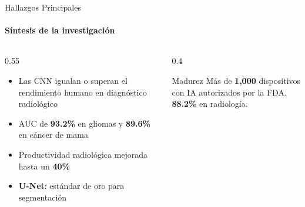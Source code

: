 \begin{frame}{Hallazgos Principales}
\framesubtitle{Síntesis de la investigación}

\begin{columns}[T]
\begin{column}{0.55\textwidth}
\begin{itemize}
    \item Las CNN \alert{igualan o superan} el rendimiento humano en diagnóstico radiológico
    \item AUC de \textbf{93.2\%} en gliomas y \textbf{89.6\%} en cáncer de mama
    \item Productividad radiológica mejorada hasta un \textbf{40\%}
    \item \textbf{U-Net}: estándar de oro para segmentación
\end{itemize}
\end{column}
\begin{column}{0.4\textwidth}
\begin{alertblock}{\faCheckCircle\; Madurez}
Más de \textbf{1,000} dispositivos con IA autorizados por la FDA.\\[4pt]
\textbf{88.2\%} en radiología.
\end{alertblock}
\end{column}
\end{columns}

\end{frame}
